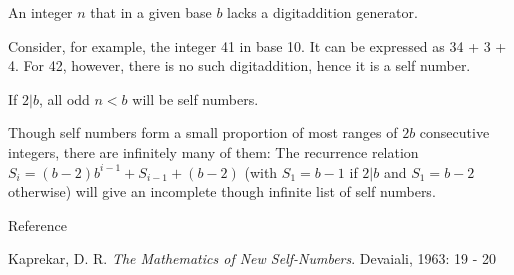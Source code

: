 \documentclass[12pt]{article}
\begin{document}
An integer $n$ that in a given base $b$ lacks a digitaddition generator.

Consider, for example, the integer 41 in base 10. It can be expressed as 34 + 3 + 4. For 42, however, there is no such digitaddition, hence it is a self number.

If $2|b$, all odd $n < b$ will be self numbers.

Though self numbers form a small proportion of most ranges of $2b$ consecutive integers, there are infinitely many of them: The recurrence relation $S_i = (b - 2)b^{i - 1} + S_{i - 1} + (b - 2)$ (with $S_1 = b - 1$ if $2|b$ and $S_1 = b - 2$ otherwise) will give an incomplete though infinite list of self numbers.

Reference

Kaprekar, D. R. {\em The Mathematics of New Self-Numbers}. Devaiali, 1963: 19 - 20
\end{document}
